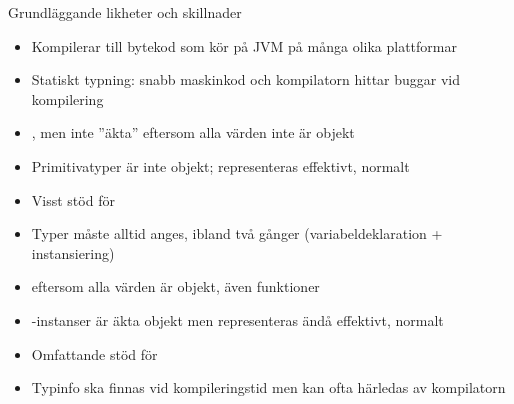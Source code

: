 

\ifkompendium\else

\begin{Slide}{Grundläggande likheter och skillnader}\SlideFontSmall
{}
\begin{itemize}\SlideFontTiny
\item Kompilerar till bytekod som kör på JVM på många olika plattformar
\item Statiskt typning: snabb maskinkod och kompilatorn hittar buggar vid kompilering
\end{itemize}

 \vspace{-1em}
\begin{multicols}{2}
\begin{itemize}\SlideFontTiny
\item {}, men inte ''äkta''  eftersom alla värden inte är objekt

\item Primitivatyper är inte objekt; representeras effektivt, normalt 

\item Visst stöd för 

\item Typer måste alltid anges, ibland två gånger (variabeldeklaration + instansiering)
\end{itemize}

\columnbreak

\begin{itemize}\SlideFontTiny
\item {} eftersom alla värden är objekt, även funktioner

\item {}-instanser är äkta objekt men representeras ändå effektivt, normalt  

\item Omfattande stöd för 

\item Typinfo ska finnas vid kompileringstid men kan ofta härledas av kompilatorn
\end{itemize}

\end{multicols}
\end{Slide}

